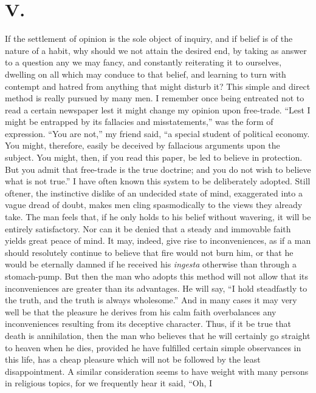 \section*{V.}

If the settlement of opinion is the sole object of inquiry, and if
belief is of the nature of a habit, why should we not attain the
desired end, by taking as answer to a question any we may fancy, and
constantly reiterating it to ourselves, dwelling on all which may
conduce to that belief, and learning to turn with contempt and hatred
from anything that might disturb it? This simple and direct method is
really pursued by many men. I remember once being entreated not to
read a certain newspaper lest it might change my opinion upon
free-trade. ``Lest I might be entrapped by its fallacies and
misstatements,'' was the form of expression. ``You are not,'' my
friend said, ``a special student of political economy. You might,
therefore, easily be deceived by fallacious arguments upon the
subject. You might, then, if you read this paper, be led to believe in
protection. But you admit that free-trade is the true doctrine; and
you do not wish to believe what is not true.'' I have often known this
system to be deliberately adopted. Still oftener, the instinctive
dislike of an undecided state of mind, exaggerated into a vague
dread of doubt, makes men cling spasmodically to the views they
already take. The man feels that, if he only holds to his belief
without wavering, it will be entirely satisfactory. Nor can it be
denied that a steady and immovable faith yields great peace of mind.
It may, indeed, give rise to inconveniences, as if a man should
resolutely continue to believe that fire would not burn him, or that
he would be eternally damned if he received his \textit{ingesta}
otherwise than through a stomach-pump. But then the man who adopts
this method will not allow that its inconveniences are greater than
its advantages. He will say, ``I hold steadfastly to the truth, and
the truth is always wholesome.'' And in many cases it may very well be
that the pleasure he derives from his calm faith overbalances any
inconveniences resulting from its deceptive character. Thus, if it be
true that death is annihilation, then the man who believes that he
will certainly go straight to heaven when he dies, provided he have
fulfilled certain simple observances in this life, has a cheap
pleasure which will not be followed by the least disappointment. A
similar consideration seems to have weight with many persons in
religious topics, for we frequently hear it said, ``Oh,  I
